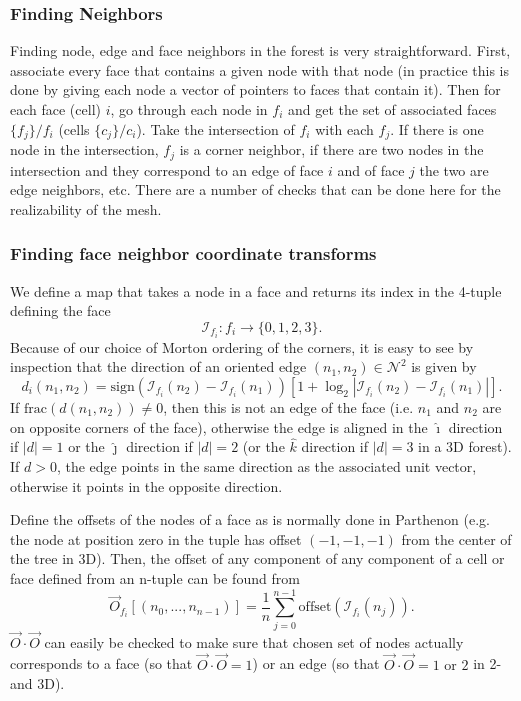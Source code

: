 \documentclass{article}
\begin{document}
\subsubsection{Finding Neighbors}
Finding node, edge and face neighbors in the forest is very straightforward. First, associate every face that contains a given node with that node (in practice this is done by giving each node a vector of pointers to faces that contain it). Then for each face (cell) $i$, go through each node in $f_i$ and get the set of associated faces $\{f_j\} / f_i$ (cells $\{c_j\} / c_i$). Take the intersection of $f_i$ with each $f_j$. If there is one node in the intersection, $f_j$ is a corner neighbor, if there are two nodes in the intersection and they correspond to an edge of face $i$ and of face $j$ the two are edge neighbors, etc. There are a number of checks that can be done here for the realizability of the mesh. 

\subsubsection{Finding face neighbor coordinate transforms}
We define a map that takes a node in a face and returns its index in the 4-tuple defining the face
\begin{equation}
\mathcal{I}_{f_i}: f_i \rightarrow \{0, 1, 2, 3\}.  
\end{equation}
Because of our choice of Morton ordering of the corners, it is easy to see by inspection that the direction of an oriented edge $(n_1, n_2) \in \mathcal{N}^2$ is given by 
\begin{equation}
d_i(n_1, n_2) = \textrm{sign}(\mathcal{I}_{f_i}(n_2) -  \mathcal{I}_{f_i}(n_1)) \left[1 + \log_2 \left |\mathcal{I}_{f_i}(n_2) -  \mathcal{I}_{f_i}(n_1)\right|\right].
\end{equation}
If $\textrm{frac}(d(n_1, n_2)) \neq 0$, then this is not an edge of the face (i.e. $n_1$ and $n_2$ are on opposite corners of the face), otherwise the edge is aligned in the $\hat \imath$ direction if $|d| = 1$ or the $\hat \jmath$ direction if $|d| = 2$ (or the $\hat k$ direction if $|d|=3$ in a 3D forest). If $ d > 0$, the edge points in the same direction as the associated unit vector, otherwise it points in the opposite direction. 

Define the offsets of the nodes of a face as is normally done in Parthenon (e.g. the node at position zero in the tuple has offset $(-1, -1, -1)$ from the center of the tree in 3D). Then, the offset of any component of any component of a cell or face defined from an n-tuple can be found from 
\begin{equation}
\vec{O}_{f_i}[(n_0, ..., n_{n-1})] = \frac{1}{n} \sum_{j=0}^{n-1} \textrm{offset}(\mathcal{I}_{f_i}(n_j)).
\end{equation}
$\vec{O} \cdot \vec{O}$ can easily be checked to make sure that chosen set of nodes actually corresponds to a face (so that $\vec{O} \cdot \vec{O} = 1$) or an edge (so that $\vec{O} \cdot \vec{O} = 1 \textrm{ or } 2$ in 2- and 3D).
\end{document}
